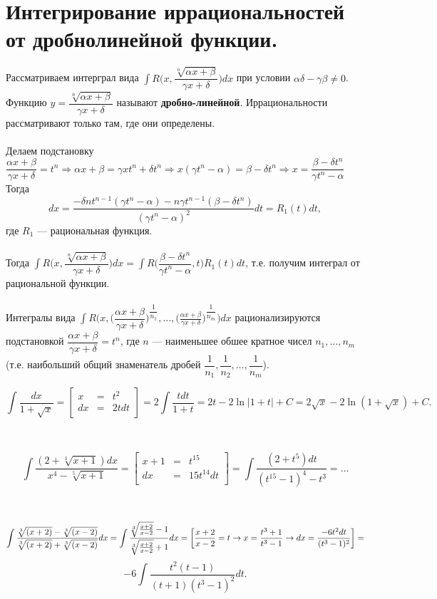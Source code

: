 \section{Интегрирование иррациональностей от дробнолинейной функции.}
Рассматриваем интерграл вида $\int R\Big(x, \dfrac{\sqrt[n]{\alpha x+\beta}}{\gamma x+\delta}\Big)dx$ при условии $\alpha\delta-\gamma\beta\neq0$. Функцию $y=\dfrac{\sqrt[n]{\alpha x+\beta}}{\gamma x+\delta}$ называют \textbf{дробно-линейной}. Иррациональности рассматривают только там, где они определены.\\\\
Делаем подстановку $\dfrac{\alpha x+\beta}{\gamma x+\delta}=t^n\Rightarrow\alpha x+\beta=\gamma xt^n+\delta t^n\Rightarrow x(\gamma t^n-\alpha)=\beta-\delta t^n\Rightarrow x=\dfrac{\beta-\delta t^n}{\gamma t^n-\alpha}$\\
Тогда $$dx=\dfrac{-\delta nt^{n-1}(\gamma t^n-\alpha)-n\gamma t^{n-1}(\beta-\delta t^n)}{(\gamma t^n-\alpha)^2}dt=R_1(t)dt,$$ где $R_1$ --- рациональная функция.\\\\
Тогда $\int R\Big(x, \dfrac{\sqrt[n]{\alpha x+\beta}}{\gamma x+\delta}\Big)dx=\int R\Big(\dfrac{\beta-\delta t^n}{\gamma t^n-\alpha},t\Big)R_1(t)dt$, т.е. получим интеграл от рациональной функции.\\\\
Интегралы вида $\int R\Big(x, \Big(\dfrac{\alpha x+\beta}{\gamma x+\delta}\Big)^{\dfrac{1}{n_1}},\dots,\Big(\frac{\alpha x+\beta}{\gamma x+\delta}\Big)^{\dfrac{1}{n_m}}\Big)dx$ рационализируются подстановкой $\dfrac{\alpha x+\beta}{\gamma x+\delta}=t^n$, где $n$ --- наименьшее обшее кратное чисел $n_1, \dots, n_m$(т.е. наибольший общий знаменатель дробей $\dfrac{1}{n_1},\dfrac{1}{n_2},\dots,\dfrac{1}{n_m}$).\\
\begin{example} $$\int\frac{dx}{1+\sqrt{x}}=\left[
	\begin{array}{ccc}
		x & = & t^2 \\
		dx & = & 2tdt \\
	\end{array}
	\right]=2\int\frac{tdt}{1+t}=2t-2\ln{|1+t|}+C=2\sqrt{x}-2\ln{(1+\sqrt{x})}+C.$$
\end{example}\\
\begin{example} $$\int\frac{(2+\sqrt[3]{x+1})dx}{x^4-\sqrt[5]{x+1}}=\left[
	\begin{array}{ccc}
		x+1 & = & t^{15} \\
		dx & = & 15t^{14}dt \\
	\end{array}
	\right]=\int\frac{(2+t^5)dt}{(t^{15}-1)^4-t^3}=\dots$$
\end{example}\\
\begin{example} $$\int\frac{\sqrt[3]{(x+2)}-\sqrt[3]{(x-2)}}{\sqrt[3]{(x+2)}+\sqrt[3]{(x-2)}}dx=\int\frac{\sqrt[3]{\frac{x+2}{x-2}}-1}{\sqrt[3]{\frac{x+2}{x-2}}+1}dx=\left[
	\frac{x+2}{x-2} = t \rightarrow x= \frac{t^3+1}{t^3-1} \rightarrow dx  = \frac{-6t^2dt}{(t^3-1)^2} \\
	\right]=$$ $$-6\int\frac{t^2(t-1)}{(t+1)(t^3-1)^2}dt.$$
\end{example}
